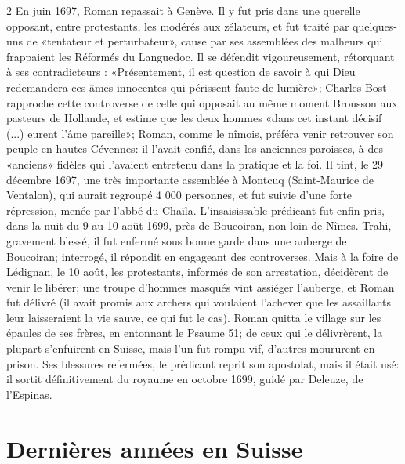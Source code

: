 {\begin{multicols}{2}
En juin 1697, Roman repassait à Genève. Il y fut pris dans une querelle opposant, entre protestants, les modérés aux zélateurs, et fut traité par quelques-uns de «tentateur et perturbateur», cause par ses assemblées des malheurs qui frappaient les Réformés du Languedoc. Il se défendit vigoureusement, rétorquant à ses contradicteurs : «Présentement, il est question de savoir à qui Dieu redemandera ces âmes innocentes qui périssent faute de lumière»; Charles Bost rapproche cette controverse de celle qui opposait au même moment Brousson aux pasteurs de Hollande, et estime que les deux hommes «dans cet instant décisif (...) eurent l’âme pareille»; Roman, comme le nîmois, préféra venir retrouver son peuple en hautes Cévennes: il l’avait confié, dans les anciennes paroisses, à des «anciens» fidèles qui l’avaient entretenu dans la pratique et la foi. Il tint, le 29 décembre 1697, une très importante assemblée à Montcuq (Saint-Maurice de Ventalon), qui aurait regroupé 4 000 personnes, et fut suivie d’une forte répression, menée par l’abbé du Chaïla. L’insaisissable prédicant fut enfin pris, dans la nuit du 9 au 10 août 1699, près de Boucoiran, non loin de Nîmes. Trahi, gravement blessé, il fut enfermé sous bonne garde dans une auberge de Boucoiran; interrogé, il répondit en engageant des controverses. Mais à la foire de Lédignan, le 10 août, les protestants, informés de son arrestation, décidèrent de venir le libérer; une troupe d’hommes masqués vint assiéger l’auberge, et Roman fut délivré (il avait promis aux archers qui voulaient l’achever que les assaillants leur laisseraient la vie sauve, ce qui fut le cas). Roman quitta le village sur les épaules de ses frères, en entonnant le Psaume 51; de ceux qui le délivrèrent, la plupart s’enfuirent en Suisse, mais l’un fut rompu vif, d’autres moururent en prison. Ses blessures refermées, le prédicant reprit son apostolat, mais il était usé: il sortit définitivement du royaume en octobre 1699, guidé par Deleuze, de l’Espinas.

\section*{Dernières années en Suisse}


\end{multicols}}
